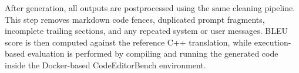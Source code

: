 After generation, all outputs are postprocessed using the same cleaning
pipeline. This step removes markdown code fences, duplicated prompt fragments,
incomplete trailing sections, and any repeated system or user messages. BLEU
score is then computed against the reference C++ translation, while
execution-based evaluation is performed by compiling and running the generated
code inside the Docker-based CodeEditorBench environment.